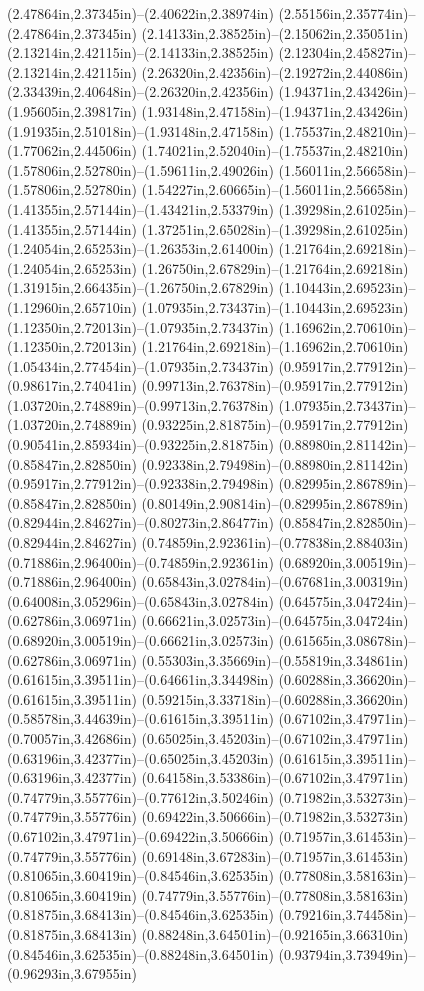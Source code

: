 (2.47864in,2.37345in)--(2.40622in,2.38974in) (2.55156in,2.35774in)--(2.47864in,2.37345in) (2.14133in,2.38525in)--(2.15062in,2.35051in) (2.13214in,2.42115in)--(2.14133in,2.38525in) (2.12304in,2.45827in)--(2.13214in,2.42115in) (2.26320in,2.42356in)--(2.19272in,2.44086in) (2.33439in,2.40648in)--(2.26320in,2.42356in) (1.94371in,2.43426in)--(1.95605in,2.39817in) (1.93148in,2.47158in)--(1.94371in,2.43426in) (1.91935in,2.51018in)--(1.93148in,2.47158in) (1.75537in,2.48210in)--(1.77062in,2.44506in) (1.74021in,2.52040in)--(1.75537in,2.48210in) (1.57806in,2.52780in)--(1.59611in,2.49026in) (1.56011in,2.56658in)--(1.57806in,2.52780in) (1.54227in,2.60665in)--(1.56011in,2.56658in) (1.41355in,2.57144in)--(1.43421in,2.53379in) (1.39298in,2.61025in)--(1.41355in,2.57144in) (1.37251in,2.65028in)--(1.39298in,2.61025in) (1.24054in,2.65253in)--(1.26353in,2.61400in) (1.21764in,2.69218in)--(1.24054in,2.65253in) (1.26750in,2.67829in)--(1.21764in,2.69218in) (1.31915in,2.66435in)--(1.26750in,2.67829in) (1.10443in,2.69523in)--(1.12960in,2.65710in) (1.07935in,2.73437in)--(1.10443in,2.69523in) (1.12350in,2.72013in)--(1.07935in,2.73437in) (1.16962in,2.70610in)--(1.12350in,2.72013in) (1.21764in,2.69218in)--(1.16962in,2.70610in) (1.05434in,2.77454in)--(1.07935in,2.73437in) (0.95917in,2.77912in)--(0.98617in,2.74041in) (0.99713in,2.76378in)--(0.95917in,2.77912in) (1.03720in,2.74889in)--(0.99713in,2.76378in) (1.07935in,2.73437in)--(1.03720in,2.74889in) (0.93225in,2.81875in)--(0.95917in,2.77912in) (0.90541in,2.85934in)--(0.93225in,2.81875in) (0.88980in,2.81142in)--(0.85847in,2.82850in) (0.92338in,2.79498in)--(0.88980in,2.81142in) (0.95917in,2.77912in)--(0.92338in,2.79498in) (0.82995in,2.86789in)--(0.85847in,2.82850in) (0.80149in,2.90814in)--(0.82995in,2.86789in) (0.82944in,2.84627in)--(0.80273in,2.86477in) (0.85847in,2.82850in)--(0.82944in,2.84627in) (0.74859in,2.92361in)--(0.77838in,2.88403in) (0.71886in,2.96400in)--(0.74859in,2.92361in) (0.68920in,3.00519in)--(0.71886in,2.96400in) (0.65843in,3.02784in)--(0.67681in,3.00319in) (0.64008in,3.05296in)--(0.65843in,3.02784in) (0.64575in,3.04724in)--(0.62786in,3.06971in) (0.66621in,3.02573in)--(0.64575in,3.04724in) (0.68920in,3.00519in)--(0.66621in,3.02573in) (0.61565in,3.08678in)--(0.62786in,3.06971in) (0.55303in,3.35669in)--(0.55819in,3.34861in) (0.61615in,3.39511in)--(0.64661in,3.34498in) (0.60288in,3.36620in)--(0.61615in,3.39511in) (0.59215in,3.33718in)--(0.60288in,3.36620in) (0.58578in,3.44639in)--(0.61615in,3.39511in) (0.67102in,3.47971in)--(0.70057in,3.42686in) (0.65025in,3.45203in)--(0.67102in,3.47971in) (0.63196in,3.42377in)--(0.65025in,3.45203in) (0.61615in,3.39511in)--(0.63196in,3.42377in) (0.64158in,3.53386in)--(0.67102in,3.47971in) (0.74779in,3.55776in)--(0.77612in,3.50246in) (0.71982in,3.53273in)--(0.74779in,3.55776in) (0.69422in,3.50666in)--(0.71982in,3.53273in) (0.67102in,3.47971in)--(0.69422in,3.50666in) (0.71957in,3.61453in)--(0.74779in,3.55776in) (0.69148in,3.67283in)--(0.71957in,3.61453in) (0.81065in,3.60419in)--(0.84546in,3.62535in) (0.77808in,3.58163in)--(0.81065in,3.60419in) (0.74779in,3.55776in)--(0.77808in,3.58163in) (0.81875in,3.68413in)--(0.84546in,3.62535in) (0.79216in,3.74458in)--(0.81875in,3.68413in) (0.88248in,3.64501in)--(0.92165in,3.66310in) (0.84546in,3.62535in)--(0.88248in,3.64501in) (0.93794in,3.73949in)--(0.96293in,3.67955in) 